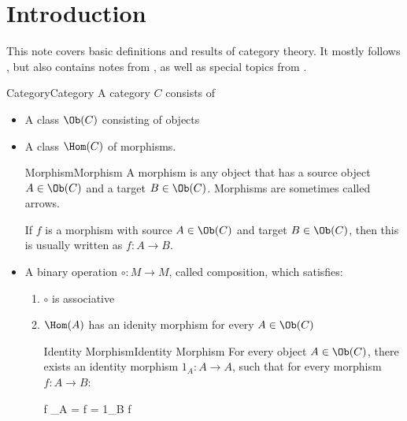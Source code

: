 \documentclass[12pt]{article}
\title{\currfilebase} %
\author{Loris Jautakas}
\begin{document}
\maketitle



\section{Introduction}

This note covers basic definitions and results of category theory. It mostly follows \cite{riehl_2016}, but also contains notes from \cite{simmons_2011},
as well as special topics from \cite{nourani_2014}.


\begin{definition}{Category}{Category}
	A category $C$ consists of
	\begin{itemize}
		\item
		 A class $\Ob(C)$ consisting of objects
		\item
		 A class $\Hom(C)$ of morphisms.
		
		\begin{definition}{Morphism}{Morphism}
			A morphism is any object that has a source object $A \in \Ob(C)$ and a target $B \in \Ob(C)$. Morphisms are sometimes called arrows. 
			
			If $f$ is a morphism with source $A \in \Ob(C)$ and target $B \in \Ob(C)$, then this is usually written as $f:A \to B$. 
		\end{definition}
		\item
		
		A binary operation $\circ : M \to M$, called composition, which satisfies:
		\begin{enumerate}
			\item
			 
			$\circ$ is associative
			\item
			 $\Hom(A)$ has an idenity morphism for every $A \in \Ob(C)$
			\begin{definition}{Identity Morphism}{Identity Morphism}
				For every object $A \in \Ob(C)$, there exists an identity morphism $1_A : A \to A$, such that for every morphism $f:A \to B$:
				\begin{niceeq}
					f _A = f = 1_B \circ f  
				\end{niceeq}
			\end{definition}
		\end{enumerate}
	\end{itemize}
\end{definition}
\end{document}
